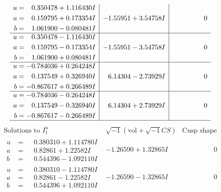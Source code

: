 \documentclass[1p]{elsarticle_modified}
\theoremstyle{definition}
\newcommand{\I}{\sqrt{-1}}
\begin{document}
$$\begin{array}{c|c|c}
\begin{aligned}
u &= \phantom{-}0.350478 + 1.116430 I \\
a &= \phantom{-}0.159795 + 0.173354 I \\
b &= \phantom{-}1.061900 - 0.080481 I\end{aligned}
 & -1.55951 + 3.54758 I & \phantom{-0.000000 } 0 \\ \hline\begin{aligned}
u &= \phantom{-}0.350478 - 1.116430 I \\
a &= \phantom{-}0.159795 - 0.173354 I \\
b &= \phantom{-}1.061900 + 0.080481 I\end{aligned}
 & -1.55951 - 3.54758 I & \phantom{-0.000000 } 0 \\ \hline\begin{aligned}
u &= -0.784036 + 0.264248 I \\
a &= \phantom{-}0.137549 + 0.326940 I \\
b &= -0.867617 + 0.266489 I\end{aligned}
 & \phantom{-}6.14304 - 2.73929 I & \phantom{-0.000000 } 0 \\ \hline\begin{aligned}
u &= -0.784036 - 0.264248 I \\
a &= \phantom{-}0.137549 - 0.326940 I \\
b &= -0.867617 - 0.266489 I\end{aligned}
 & \phantom{-}6.14304 + 2.73929 I & \phantom{-0.000000 } 0\\
 \hline 
 \end{array}$$\newpage$$\begin{array}{c|c|c}  
\text{Solutions to }I^u_{1}& \I (\text{vol} + \sqrt{-1}CS) & \text{Cusp shape}\\
 \hline 
\begin{aligned}
u &= \phantom{-}0.380310 + 1.114780 I \\
a &= \phantom{-}0.82861 + 1.22582 I \\
b &= \phantom{-}0.544396 - 1.092110 I\end{aligned}
 & -1.26590 + 1.32865 I & \phantom{-0.000000 } 0 \\ \hline\begin{aligned}
u &= \phantom{-}0.380310 - 1.114780 I \\
a &= \phantom{-}0.82861 - 1.22582 I \\
b &= \phantom{-}0.544396 + 1.092110 I\end{aligned}
 & -1.26590 - 1.32865 I & \phantom{-0.000000 } 0 \\ \hline\begin{aligned}

\end{aligned}
\end{array}$$
\end{document}
